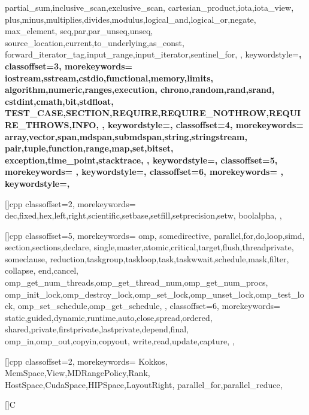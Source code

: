 {{    partial_sum,inclusive_scan,exclusive_scan,
    cartesian_product,iota,iota_view,
    plus,minus,multiplies,divides,modulus,logical_and,logical_or,negate,
    max_element,
    seq,par,par_unseq,unseq,
    source_location,current,to_underlying,as_const,
    forward_iterator_tag,input_range,input_iterator,sentinel_for,
  },
  keywordstyle=\bfseries\color{jade},
  classoffset=3,
  morekeywords={
    iostream,sstream,cstdio,functional,memory,limits,
    algorithm,numeric,ranges,execution,
    chrono,random,rand,srand,
    cstdint,cmath,bit,stdfloat,
    TEST_CASE,SECTION,REQUIRE,REQUIRE_NOTHROW,REQUIRE_THROWS,INFO,
  },
  keywordstyle=\bfseries\color{green!40!blue!60},
  classoffset=4,
  morekeywords={
    array,vector,span,mdspan,submdspan,string,stringstream,
    pair,tuple,function,range,map,set,bitset,
    exception,time_point,stacktrace,
  },
  keywordstyle=\bfseries\color{lavender(floral)},
  classoffset=5,
  morekeywords={
  },
  keywordstyle=\bfseries\color{green!40!red!60},
  classoffset=6,
  morekeywords={
  },
  keywordstyle=\bfseries\color{green!70!red!30},
}
\newcommand\lstcstd[1]{\lstinline{std::#1}}

[]{cpp}{
  classoffset=2,
  morekeywords={
    dec,fixed,hex,left,right,scientific,setbase,setfill,setprecision,setw,
    boolalpha,
  },
}

[]{cpp}{
  classoffset=5,
  morekeywords={
    omp,
    somedirective,
    parallel,for,do,loop,simd,
    section,sections,declare,
    single,master,atomic,critical,target,flush,threadprivate,
    someclause,
    reduction,taskgroup,taskloop,task,taskwwait,schedule,mask,filter,
    collapse,
    end,cancel,
    omp_get_num_threads,omp_get_thread_num,omp_get_num_procs,
    omp_init_lock,omp_destroy_lock,omp_set_lock,omp_unset_lock,omp_test_lock,
    omp_set_schedule,omp_get_schedule,
  },
  classoffset=6,
  morekeywords={
    static,guided,dynamic,runtime,auto,close,spread,ordered,
    shared,private,firstprivate,lastprivate,depend,final,
    omp_in,omp_out,copyin,copyout,
    write,read,update,capture,
  },
}

[]{cpp}{
  classoffset=2,
  morekeywords={
    Kokkos,
    MemSpace,View,MDRangePolicy,Rank,
    HostSpace,CudaSpace,HIPSpace,LayoutRight,
    parallel_for,parallel_reduce,
  }
}

[]{C}{
}

